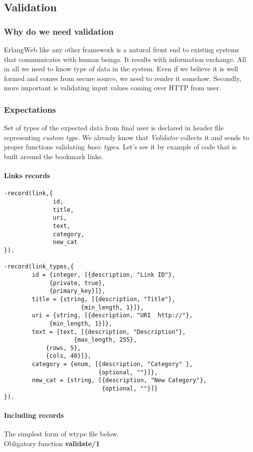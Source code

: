 \subsection{Validation}
\subsubsection{Why do we need validation}
ErlangWeb like any other framework is a natural front end to existing systems that
communicates with human beings. It results with information exchange. All in all we need to
know type of data in the system. Even if we believe it is well formed and
comes from secure source, we need to render it somehow. Secondly, more important is
validating input values coming over HTTP from user.

\subsubsection{Expectations}
Set of types of the expected data from final user is declared in header file
representing \textit{custom type}. We already know 
that \textit{Validator} collects it and sends to proper functions
validating \textit{basic types}. Let's see it by example of code that is built
around the bookmark links.

\paragraph{Links records}
\begin{Verbatim}[fontsize=\small]
-record(link,{
              id,
              title,
              uri,
              text,
              category,
              new_cat
}).

-record(link_types,{
        id = {integer, [{description, "Link ID"},
			 {private, true},
			 {primary_key}]},
        title = {string, [{description, "Title"},
	                  {min_length, 1}]},
        uri = {string, [{description, "URI  http://"},
			 {min_length, 1}]},
        text = {text, [{description, "Description"},
	                {max_length, 255},
			{rows, 5},
			{cols, 40}]},
        category = {enum, [{description, "Category" },
                           {optional, ""}]},
        new_cat = {string, [{description, "New Category"},
                            {optional, ""}]}
}).
\end{Verbatim}

\paragraph{Including records} 
The simplest form of wtype file below. \\
Obligatory function \textbf{validate/1}

